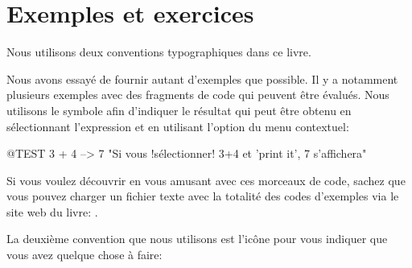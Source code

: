 \documentclass[a4paper,10pt,twoside]{book}
\begin{document}


\section*{Exemples et exercices}

Nous utilisons deux conventions typographiques dans ce livre.

Nous avons essayé de fournir autant d'exemples que possible.
Il y a notamment plusieurs exemples avec des fragments de code qui
peuvent être évalués. Nous utilisons le symbole \ct{-->} afin
d'indiquer le résultat qui peut être obtenu en sélectionnant
l'expression et en utilisant l'option  du menu contextuel:

\begin{code}{@TEST}
3 + 4 --> 7    "Si vous !sélectionner! 3+4 et 'print it', 7 s'affichera"
\end{code}

Si vous voulez découvrir \pharo en vous amusant avec ces morceaux de
code, sachez que vous pouvez charger un fichier texte avec la
totalité des codes d'exemples via le site web du livre: \ppe. 

La deuxième convention que nous utilisons est l'icône
\dothisicon{} pour vous indiquer que vous avez quelque chose à faire: 


\end{document}
